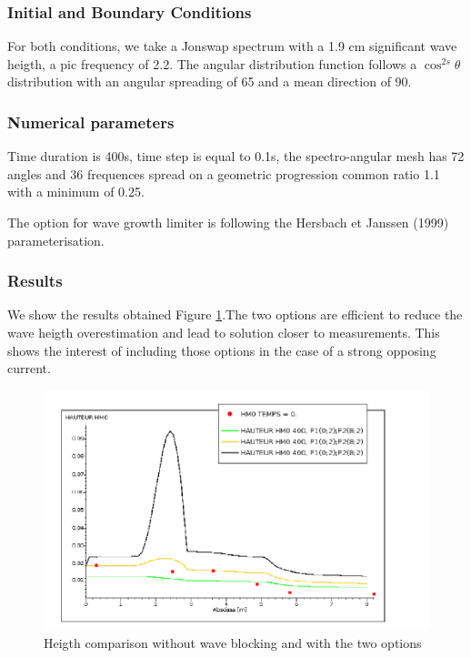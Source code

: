 %
%
\subsubsection{Initial and Boundary Conditions}
%
For both conditions, we take a Jonswap spectrum with a 1.9 cm significant wave heigth, a pic frequency of 2.2. The angular distribution function follows a $\cos^{2s} \theta$ distribution with an angular spreading of 65 and a mean direction of 90.
%
%
\subsubsection{Numerical parameters}
%
Time duration is 400s, time step is equal to 0.1s, the spectro-angular mesh has 72 angles and 36 frequences spread on a geometric progression common ratio 1.1 with a minimum of 0.25. 

The option for wave growth limiter is following the Hersbach et Janssen (1999) parameterisation.

%
%
\subsubsection{Results}
%
We show the results obtained Figure \ref{reswaveblocking}.The two options are efficient to reduce the wave heigth overestimation and lead to solution closer to measurements. This shows the interest of including those options in the case of a strong opposing current. 
 
\begin{figure} [!h]
\centering
\includegraphics[scale = 0.4]{hauteur.png}
 \caption{Heigth comparison without wave blocking and with the two options}
\label{reswaveblocking}
\end{figure}




